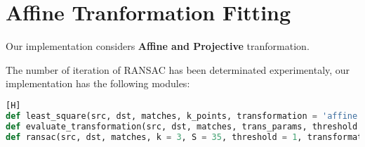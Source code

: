 \section{Affine Tranformation Fitting}

Our implementation considers \textbf{Affine and Projective} tranformation.

The number of iteration of RANSAC has been determinated experimentaly, our implementation has the following modules:

\begin{lstlisting}[language=python][H]
def least_square(src, dst, matches, k_points, transformation = 'affine'):
def evaluate_transformation(src, dst, matches, trans_params, threshold = 1, transformation = 'affine'):
def ransac(src, dst, matches, k = 3, S = 35, threshold = 1, transformation = 'affine'):
\end{lstlisting}

